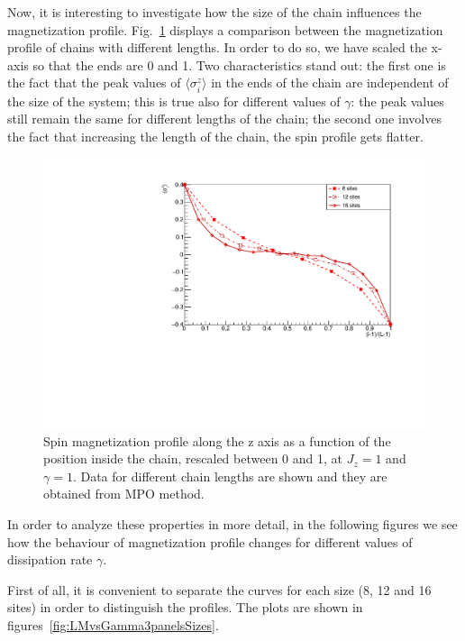 Now, it is interesting to investigate how the size of the chain influences the magnetization profile. Fig.~\ref{fig:LM_comparisonVSsizeJz1Gamma1} displays a comparison between the magnetization profile of chains with different lengths. In order to do so, we have scaled the x-axis so that the ends are 0 and 1. Two characteristics stand out: the first one is the fact that the peak values of $\langle\sigma_i^z\rangle$ in the ends of the chain are independent of the size of the system; this is true also for different values of $\gamma$: the peak values still remain the same for different lengths of the chain; the second one involves the fact that increasing the length of the chain, the spin profile gets flatter.

\begin{figure}[H]
    \centering
    \includegraphics[scale=0.7]{Figures/NORM_LM_comparisonVSsize.pdf}
    \captionsetup{width=1.\linewidth}
    \caption{Spin magnetization profile along the z axis as a function of the position inside the chain, rescaled between 0 and 1, at $J_z = 1$ and $\gamma=1$. Data for different chain lengths are shown and they are obtained from MPO method.}
    \label{fig:LM_comparisonVSsizeJz1Gamma1}
\end{figure}

In order to analyze these properties in more detail, in the following figures we see how the behaviour of magnetization profile changes for different values of dissipation rate $\gamma$. 

First of all, it is convenient to separate the curves for each size (8, 12 and 16 sites) in order to distinguish the profiles. The plots are shown in figures~\ref{fig:LMvsGamma3panelsSizes}.

